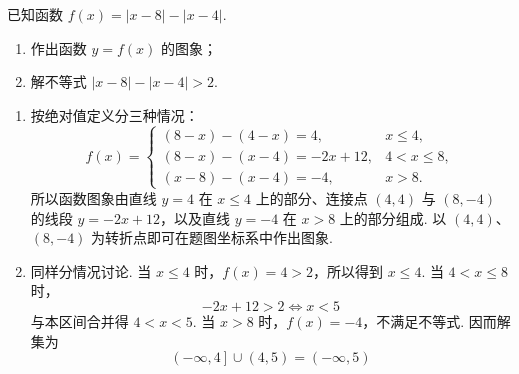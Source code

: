 \begin{problem}
已知函数 \(f(x) = |x - 8| - |x - 4|\).

\begin{enumerate}
\item 作出函数 \( y = f(x) \) 的图象；
\item 解不等式 \( |x - 8| - |x - 4| > 2 \).
\end{enumerate}


\begin{solution}
\begin{enumerate}
\item 按绝对值定义分三种情况：
\[
f(x)=\begin{cases}
\left(8-x\right)-\left(4-x\right)=4,&x\le4,\\
\left(8-x\right)-\left(x-4\right)=-2x+12,&4<x\le8,\\
\left(x-8\right)-\left(x-4\right)=-4,&x>8.
\end{cases}
\]
所以函数图象由直线 \(y=4\) 在 \(x\le4\) 上的部分、连接点 \(\left(4,4\right)\) 与 \(\left(8,-4\right)\) 的线段 \(y=-2x+12\)，以及直线 \(y=-4\) 在 \(x>8\) 上的部分组成. 以 \(\left(4,4\right)\)、\(\left(8,-4\right)\) 为转折点即可在题图坐标系中作出图象.
\item 同样分情况讨论. 当 \(x\le4\) 时，\(f(x)=4>2\)，所以得到 \(x\le4\). 当 \(4<x\le8\) 时，
\[
-2x+12>2\Longleftrightarrow x<5
\]
与本区间合并得 \(4<x<5\). 当 \(x>8\) 时，\(f(x)=-4\)，不满足不等式. 因而解集为
\[
\left(-\infty,4\right]\cup\left(4,5\right)=\left(-\infty,5\right)
\]
\end{enumerate}
\end{solution}
\end{problem}
